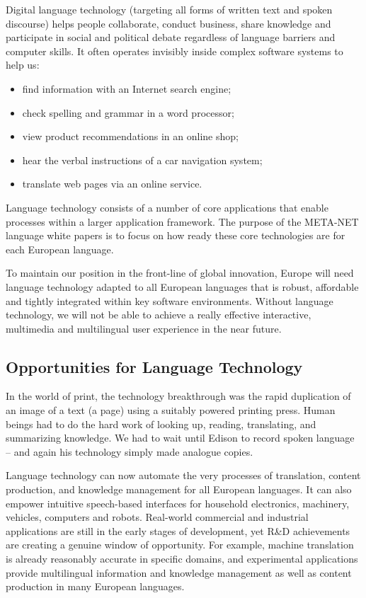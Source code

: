 \begin{multicols}{2}
    Digital language technology (targeting all forms of written text and spoken discourse) helps people collaborate, conduct business, share knowledge and participate in social and political debate regardless of language barriers and computer skills. It often operates invisibly inside complex software systems to help us:
    \begin{itemize}
      \item find information with an Internet search engine;
      \item check spelling and grammar in a word processor;
      \item view product recommendations in an online shop;
      \item hear the verbal instructions of a car navigation system;
      \item translate web pages via an online service.
    \end{itemize}
    Language technology consists of a number of core applications that enable processes within a larger application framework. The purpose of the META-NET language white papers is to focus on how ready these core technologies are for each European language. 


    To maintain our position in the front-line of global innovation, Europe will need language technology adapted to all European languages that is robust, affordable and tightly integrated within key software environments. Without language technology, we will not be able to achieve a really effective interactive, multimedia and multilingual user experience in the near future.

\subsection{Opportunities for Language Technology}


    In the world of print, the technology breakthrough was the rapid duplication of an image of a text (a page) using a suitably powered printing press. Human beings had to do the hard work of looking up, reading, translating, and summarizing knowledge. We had to wait until Edison to record spoken language – and again his technology simply made analogue copies.

    Language technology can now automate the very processes of translation, content production, and knowledge management for all European languages. It can also empower intuitive speech-based interfaces for household electronics, machinery, vehicles, computers and robots. Real-world commercial and industrial applications are still in the early stages of development, yet R\&D achievements are creating a genuine window of opportunity. For example, machine translation is already reasonably accurate in specific domains, and experimental applications provide multilingual information and knowledge management as well as content production in many European languages. 


\end{multicols}
